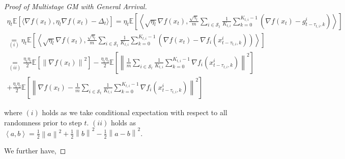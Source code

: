 \begin{proof}[Proof of Multistage GM with General Arrival]
\begin{equation}
\begin{gathered}
\eta_t\mathbb{E}\left[\langle \nabla f\left(x_t\right), \eta_l   \nabla f\left(x_t\right) - \Delta_t \rangle\right]
=\eta_t \mathbb{E}\left[\left\langle \sqrt{\eta_l} \nabla f(x_t),   \frac{\sqrt{\eta_l}}{m}\sum_{i\in\mathcal{S}_t} \frac{1}{K_{t,i}} \sum_{k=0}^{K_{t,i}-1}\left(\nabla f(x_t) -  g_{t-\tau_{t,i},k}^i\right) \right\rangle\right]\\
\underset{(i)}{=}\eta_t \mathbb{E}\left[\left\langle \sqrt{\eta_l} \nabla f(x_t),   \frac{\sqrt{\eta_l}}{m}\sum_{i\in\mathcal{S}_t} \frac{1}{K_{t,i}} \sum_{k=0}^{K_{t,i}-1}\left(\nabla f(x_t) -  \nabla f_i(x_{t-\tau_{t,i},k}^i)\right) \right\rangle\right]\\
\underset{(ii)}{=} \frac{\eta_t\eta_l}{2} \mathbb{E}\left[\left\| \nabla f(x_t) \right\|^2\right] - \frac{\eta_t\eta_l}{2} \mathbb{E}\left[\left\| \frac{1}{m}\sum_{i\in\mathcal{S}_t} \frac{1}{K_{t,i}} \sum_{k=0}^{K_{t,i}-1} \nabla f_i(x_{t-\tau_{t,i},k}^i) \right\|^2\right] \\
+ \frac{\eta_t\eta_l}{2} \mathbb{E}\left[\left\| \nabla f(x_t) - \frac{1}{m}\sum_{i\in\mathcal{S}_t} \frac{1}{K_{t,i}} \sum_{k=0}^{K_{t,i}-1}  \nabla f_i(x_{t-\tau_{t,i},k}^i) \right\|^2\right]
\end{gathered}\nonumber
\end{equation}

where $(i)$ holds as we take conditional expectation with respect to all randomness prior to step $t$. $(ii)$ holds as $\left\langle a, b \right\rangle = \frac{1}{2} \left\| a \right\|^2 + \frac{1}{2} \left\| b \right\|^2 - \frac{1}{2} \left\| a - b \right\|^2 $.

We further have, 



\end{proof}

